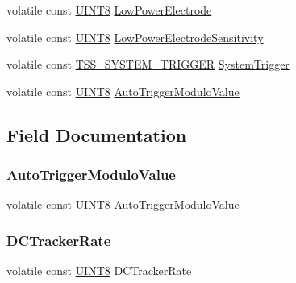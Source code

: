 \begin{DoxyCompactItemize}
\item 
volatile const \hyperlink{_t_s_s___data_types_8h_ab27e9918b538ce9d8ca692479b375b6a}{U\+I\+N\+T8} \hyperlink{struct_t_s_s___c_s_system_a2580c6192f6b1ea1b19154a4d8ecd5f3}{Low\+Power\+Electrode}
\item 
volatile const \hyperlink{_t_s_s___data_types_8h_ab27e9918b538ce9d8ca692479b375b6a}{U\+I\+N\+T8} \hyperlink{struct_t_s_s___c_s_system_acc96220356b377eeb947e5031a65e60b}{Low\+Power\+Electrode\+Sensitivity}
\item 
volatile const \hyperlink{struct_t_s_s___s_y_s_t_e_m___t_r_i_g_g_e_r}{T\+S\+S\+\_\+\+S\+Y\+S\+T\+E\+M\+\_\+\+T\+R\+I\+G\+G\+ER} \hyperlink{struct_t_s_s___c_s_system_a122ae9f08e49d72b2bd833cc8e502239}{System\+Trigger}
\item 
volatile const \hyperlink{_t_s_s___data_types_8h_ab27e9918b538ce9d8ca692479b375b6a}{U\+I\+N\+T8} \hyperlink{struct_t_s_s___c_s_system_a5fcf3e022d5d6a535717e876f19c50c6}{Auto\+Trigger\+Modulo\+Value}
\end{DoxyCompactItemize}


\subsection{Field Documentation}
\mbox{\label{struct_t_s_s___c_s_system_a5fcf3e022d5d6a535717e876f19c50c6}} 
\subsubsection{\texorpdfstring{Auto\+Trigger\+Modulo\+Value}{AutoTriggerModuloValue}}
{\footnotesize\ttfamily volatile const \hyperlink{_t_s_s___data_types_8h_ab27e9918b538ce9d8ca692479b375b6a}{U\+I\+N\+T8} Auto\+Trigger\+Modulo\+Value}

\mbox{\label{struct_t_s_s___c_s_system_a86480382c5122af4b7208f002c5b003e}} 
\subsubsection{\texorpdfstring{D\+C\+Tracker\+Rate}{DCTrackerRate}}
{\footnotesize\ttfamily volatile const \hyperlink{_t_s_s___data_types_8h_ab27e9918b538ce9d8ca692479b375b6a}{U\+I\+N\+T8} D\+C\+Tracker\+Rate}

